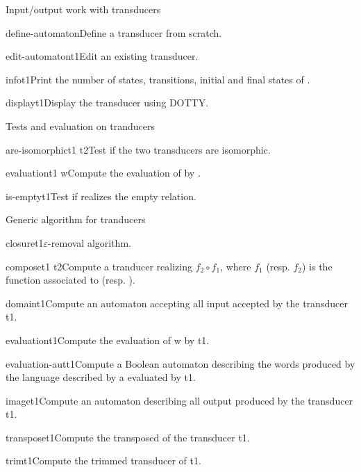 \begin{fnsection}{Input/output work with transducers}
\item{define-automaton}{}{Define a transducer from scratch.}
\item{edit-automaton}{t1}{Edit an existing transducer.}
\item{info}{t1}{Print the number of states, transitions, initial and
    final states of .}
\item{display}{t1}{Display the transducer using DOTTY.}  \hline
\end{fnsection}

\begin{fnsection}{Tests and evaluation on tranducers}
\item{are-isomorphic}{t1 t2}{Test if the two transducers are
    isomorphic.}
\item{evaluation}{t1 w}{Compute the evaluation of  by
    .}
\item{is-empty}{t1}{Test if  realizes the empty relation.}
  \hline
\end{fnsection}

\begin{fnsection}{Generic algorithm for tranducers}
\item{closure}{t1}{$\varepsilon$-removal algorithm.}

\item{compose}{t1 t2}{Compute a tranducer realizing $f_2 \circ f_1$,
    where $f_1$ (resp. $f_2$) is the function associated to 
    (resp. ).}

\item{domain}{t1}{Compute an automaton accepting all input accepted by
    the transducer t1.}

\item{evaluation}{t1}{Compute the evaluation of w by t1.}

\item{evaluation-aut}{t1}{Compute a Boolean automaton describing the
    words produced by the language described by a evaluated by t1.}

\item{image}{t1}{Compute an automaton describing all output produced
    by the transducer t1.}

\item{transpose}{t1}{Compute the transposed of the transducer t1.}

\item{trim}{t1}{Compute the trimmed transducer of t1.}  \hline
\end{fnsection}

